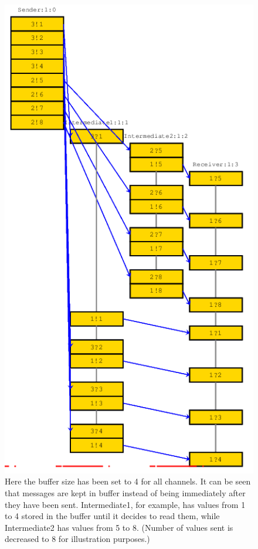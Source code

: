 \documentclass{report}
\begin{document}
\begin{itemize}
\begin{figure} [\textwidth]
\hspace{0cm}
\includegraphics[scale=0.6]{Images/nonsync.png}
\caption{Here the buffer size has been set to 4 for all channels. It can be seen that messages are kept in buffer instead of being immediately after they have been sent. Intermediate1, for example, has values from 1 to 4 stored in the buffer until it decides to read them, while Intermediate2 has values from 5 to 8. (Number of values sent is decreased to 8 for illustration purposes.)}
\end{figure}


\end{itemize}
\end{document}
